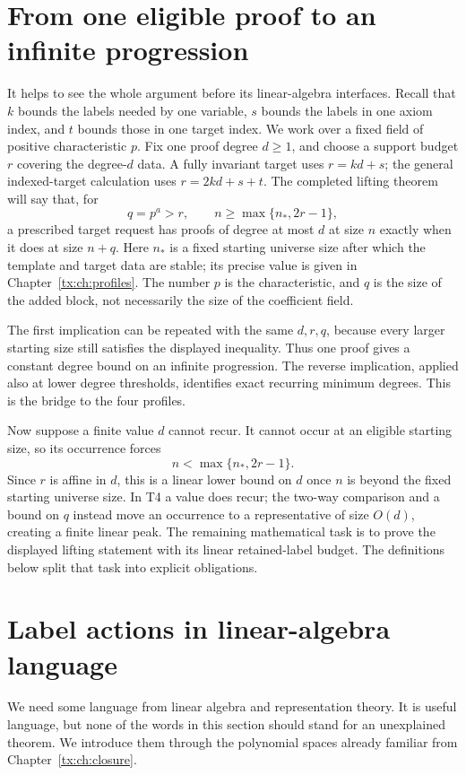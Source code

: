 \documentclass[11pt,a4paper,oneside,openany]{book}
\theoremstyle{definition}\newtheorem{definition}[theorem]{Definition}
\theoremstyle{remark}\newtheorem{remark}[theorem]{Remark}
\numberwithin{equation}{chapter}
\begin{document}
\section{From one eligible proof to an infinite progression}
It helps to see the whole argument before its linear-algebra interfaces.
Recall that $k$ bounds the labels needed by one variable, $s$ bounds
the labels in one axiom index, and $t$ bounds those in one target index.
We work over a fixed field of positive characteristic $p$.
Fix one proof degree $d\ge1$, and choose a support budget $r$ covering
the degree-$d$ data. A fully invariant target uses $r=kd+s$; the
general indexed-target calculation uses $r=2kd+s+t$. The completed
lifting theorem will say that, for
\[
 q=p^a>r,\qquad n\ge\max\{n_*,2r-1\},
\]
a prescribed target request has proofs of degree at most $d$ at size
$n$ exactly when it does at size $n+q$.
Here $n_*$ is a fixed starting universe size after which the template and target
data are stable; its precise value is given in
Chapter~\ref{tx:ch:profiles}. The number $p$ is the characteristic,
and $q$ is the size of the added block, not necessarily the size of
the coefficient field.

The first implication can be repeated with the same $d,r,q$, because
every larger starting size still satisfies the displayed inequality.
Thus one proof gives a constant degree bound on an infinite
progression. The reverse implication, applied also at lower degree
thresholds, identifies exact recurring minimum degrees. This is the
bridge to the four profiles.

Now suppose a finite value $d$ cannot recur. It cannot occur at an
eligible starting size, so its occurrence forces
\[
                    n<\max\{n_*,2r-1\}.
\]
Since $r$ is affine in $d$, this is a linear lower bound on $d$ once
$n$ is beyond the fixed starting universe size. In T4 a value does recur; the
two-way comparison and a bound on $q$ instead move an occurrence to
a representative of size $O(d)$, creating a finite linear peak.
The remaining mathematical task is to prove the displayed lifting
statement with its linear retained-label budget. The definitions below
split that task into explicit obligations.

\section{Label actions in linear-algebra language}\label{tx:sec:action-primer}
We need some language from linear algebra and representation theory.
It is useful language, but none of the words in this section should
stand for an unexplained theorem. We introduce them through the
polynomial spaces already familiar from Chapter~\ref{tx:ch:closure}.
\end{document}

